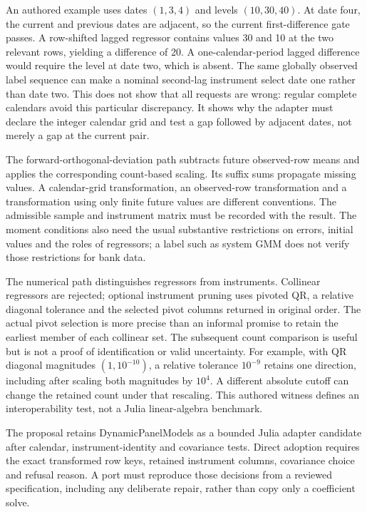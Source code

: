 An authored example uses dates $(1,3,4)$ and levels $(10,30,40)$. At date four, the current and previous dates are adjacent, so the current first-difference gate passes. A row-shifted lagged regressor contains values 30 and 10 at the two relevant rows, yielding a difference of 20. A one-calendar-period lagged difference would require the level at date two, which is absent. The same globally observed label sequence can make a nominal second-lag instrument select date one rather than date two. This does not show that all requests are wrong: regular complete calendars avoid this particular discrepancy. It shows why the adapter must declare the integer calendar grid and test a gap followed by adjacent dates, not merely a gap at the current pair.\citep{exec25_odyn_dpm,exec25_odyn_choice}

The forward-orthogonal-deviation path subtracts future observed-row means and applies the corresponding count-based scaling. Its suffix sums propagate missing values. A calendar-grid transformation, an observed-row transformation and a transformation using only finite future values are different conventions. The admissible sample and instrument matrix must be recorded with the result. The moment conditions also need the usual substantive restrictions on errors, initial values and the roles of regressors; a label such as system GMM does not verify those restrictions for bank data.

The numerical path distinguishes regressors from instruments. Collinear regressors are rejected; optional instrument pruning uses pivoted QR, a relative diagonal tolerance and the selected pivot columns returned in original order. The actual pivot selection is more precise than an informal promise to retain the earliest member of each collinear set. The subsequent count comparison is useful but is not a proof of identification or valid uncertainty. For example, with QR diagonal magnitudes $(1,10^{-10})$, a relative tolerance $10^{-9}$ retains one direction, including after scaling both magnitudes by $10^4$. A different absolute cutoff can change the retained count under that rescaling. This authored witness defines an interoperability test, not a Julia linear-algebra benchmark.\citep{exec25_odyn_dpm,exec25_odyn_choice}

The proposal retains DynamicPanelModels as a bounded Julia adapter candidate after calendar, instrument-identity and covariance tests. Direct adoption requires the exact transformed row keys, retained instrument columns, covariance choice and refusal reason. A port must reproduce those decisions from a reviewed specification, including any deliberate repair, rather than copy only a coefficient solve.

